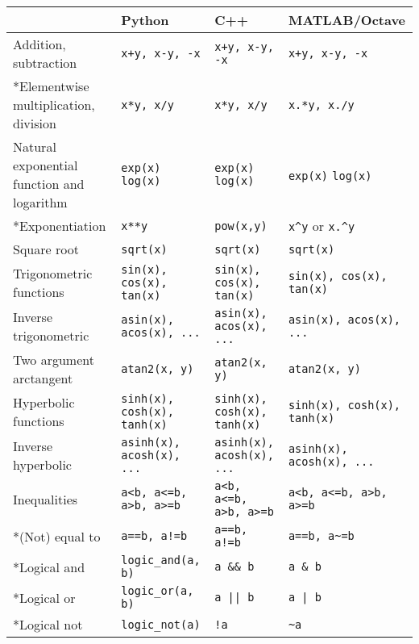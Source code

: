 \documentclass[a4paper,12pt]{book}
\begin{document}
\begin{center}
  \scriptsize
  \begin{tabular}{| p{3.5cm} | p{3.5cm} | p{3.5cm} | p{3.5cm} | }
    \hline
      & Python & C++ & MATLAB/Octave \\ \hline
    Addition, subtraction
    & \verb|x+y, x-y, -x| & \verb|x+y, x-y, -x| & \verb|x+y, x-y, -x| \\ \hline
    *Elementwise multiplication, division
    & \verb|x*y, x/y| & \verb|x*y, x/y| & \verb|x.*y, x./y| \\ \hline
    Natural exponential function and logarithm
    & \verb|exp(x)| \linebreak \verb|log(x)|
    & \verb|exp(x)| \linebreak \verb|log(x)|
    & \verb|exp(x)| \linebreak \verb|log(x)| \\ \hline
    *Exponentiation & \verb|x**y|
    & \verb|pow(x,y)| & \verb|x^y| or \verb|x.^y| \\ \hline
    Square root & \verb|sqrt(x)|
    & \verb|sqrt(x)| & \verb|sqrt(x)| \\ \hline
    Trigonometric functions & \verb|sin(x), cos(x), tan(x)| & \verb|sin(x), cos(x), tan(x)| & \verb|sin(x), cos(x), tan(x)| \\ \hline
    Inverse trigonometric & \verb|asin(x), acos(x), ...| & \verb|asin(x), acos(x), ...| & \verb|asin(x), acos(x), ...| \\ \hline
    Two argument arctangent & \verb|atan2(x, y)| & \verb|atan2(x, y)| & \verb|atan2(x, y)| \\ \hline
    Hyperbolic functions & \verb|sinh(x), cosh(x), tanh(x)| & \verb|sinh(x), cosh(x), tanh(x)| & \verb|sinh(x), cosh(x), tanh(x)| \\ \hline
    Inverse hyperbolic & \verb|asinh(x), acosh(x), ...| & \verb|asinh(x), acosh(x), ...| & \verb|asinh(x), acosh(x), ...| \\ \hline
    Inequalities & \verb|a<b, a<=b, a>b, a>=b| & \verb|a<b, a<=b, a>b, a>=b| & \verb|a<b, a<=b, a>b, a>=b| \\ \hline
    *(Not) equal to & \verb|a==b, a!=b| & \verb|a==b, a!=b| & \verb|a==b, a~=b| \\ \hline
    *Logical and & \verb|logic_and(a, b)| &\verb|a && b| &  \verb|a & b| \\ \hline
    *Logical or  & \verb|logic_or(a, b)| & \verb=a || b= & \verb=a | b= \\ \hline
    *Logical not & \verb|logic_not(a)| & \verb|!a| & \verb|~a| \\ \hline

\end{tabular}
\end{center}
\end{document}
